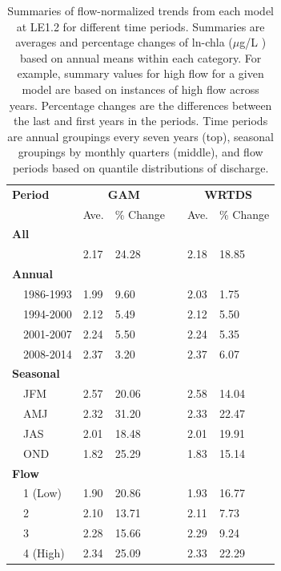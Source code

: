 \documentclass[letterpaper,12pt,oneside]{article}\usepackage[]{graphicx}\usepackage[]{color}
\newcommand{\mugl}{$\mu$g/L }
\begin{document}
\begin{table}[!tbp]
\caption{Summaries of flow-normalized trends from each model at LE1.2 for different time periods.  Summaries are averages and percentage changes of ln-\ac{chla} (\mugl) based on annual means within each category.  For example, summary values for high flow for a given model are based on instances of high flow across years.  Percentage changes are the differences between the last and first years in the periods.  Time periods are annual groupings every seven years (top), seasonal groupings by monthly quarters (middle), and flow periods based on quantile distributions of discharge.\label{tab:trendsLE12}} 
\begin{center}
\begin{tabular}{lllcll}
\hline\hline
\multicolumn{1}{l}{\bfseries Period}&\multicolumn{2}{c}{\bfseries GAM}&\multicolumn{1}{c}{\bfseries }&\multicolumn{2}{c}{\bfseries WRTDS}\tabularnewline
\cline{2-3} \cline{5-6}
\multicolumn{1}{l}{}&\multicolumn{1}{c}{Ave.}&\multicolumn{1}{c}{\% Change}&\multicolumn{1}{c}{}&\multicolumn{1}{c}{Ave.}&\multicolumn{1}{c}{\% Change}\tabularnewline
\hline
{\bfseries All}&&&&&\tabularnewline
~~&2.17&24.28&&2.18&18.85\tabularnewline
\hline
{\bfseries Annual}&&&&&\tabularnewline
~~1986-1993&1.99& 9.60&&2.03& 1.75\tabularnewline
~~1994-2000&2.12& 5.49&&2.12& 5.50\tabularnewline
~~2001-2007&2.24& 5.50&&2.24& 5.35\tabularnewline
~~2008-2014&2.37& 3.20&&2.37& 6.07\tabularnewline
\hline
{\bfseries Seasonal}&&&&&\tabularnewline
~~JFM&2.57&20.06&&2.58&14.04\tabularnewline
~~AMJ&2.32&31.20&&2.33&22.47\tabularnewline
~~JAS&2.01&18.48&&2.01&19.91\tabularnewline
~~OND&1.82&25.29&&1.83&15.14\tabularnewline
\hline
{\bfseries Flow}&&&&&\tabularnewline
~~1 (Low)&1.90&20.86&&1.93&16.77\tabularnewline
~~2&2.10&13.71&&2.11& 7.73\tabularnewline
~~3&2.28&15.66&&2.29& 9.24\tabularnewline
~~4 (High)&2.34&25.09&&2.33&22.29\tabularnewline
\hline
\end{tabular}\end{center}

\end{table}
\end{document}
